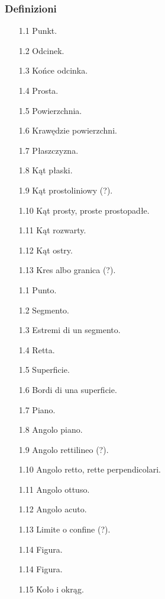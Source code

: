 \subsubsection{Definizioni} %
\begin{enumerate}
    \item [1.1] Punkt. %
    \item [1.2] Odcinek. %
    \item [1.3] Końce odcinka. %
    \item [1.4] Prosta. %
    \item [1.5] Powierzchnia. %
    \item [1.6] Krawędzie powierzchni. %
    \item [1.7] Płaszczyzna. %
    \item [1.8] Kąt płaski. %
    \item [1.9] Kąt prostoliniowy (?). %
    \item [1.10] Kąt prosty, proste prostopadłe. %
    \item [1.11] Kąt rozwarty. %
    \item [1.12] Kąt ostry. %
    \item [1.13] Kres albo granica (?). %
    \item [1.1] Punto. %
    \item [1.2] Segmento. %
    \item [1.3] Estremi di un segmento. %
    \item [1.4] Retta. %
    \item [1.5] Superficie. %
    \item [1.6] Bordi di una superficie. %
    \item [1.7] Piano. %
    \item [1.8] Angolo piano. %
    \item [1.9] Angolo rettilineo (?). %
    \item [1.10] Angolo retto, rette perpendicolari. %
    \item [1.11] Angolo ottuso. %
    \item [1.12] Angolo acuto. %
    \item [1.13] Limite o confine (?). %
    \item [1.14] Figura. %
    \item [1.14] Figura. %
    \item [1.15] Koło i okrąg. %

\end{enumerate}
